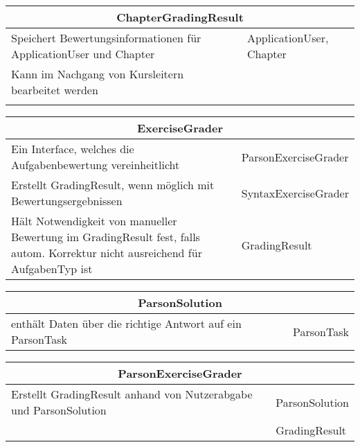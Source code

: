 \documentclass[11pt]{article}
\begin{document}
\begin{table}[h]
\begin{tabularx}{\textwidth}{|X|X|}
\hline
\multicolumn{2}{|c|}{ChapterGradingResult}\\ \hline
Speichert Bewertungsinformationen für ApplicationUser und Chapter& ApplicationUser, Chapter \\  \hline
Kann im Nachgang von Kursleitern bearbeitet werden& \\ \hline
& \\
\end{tabularx}
\end{table}

%
\begin{table}[h]
\begin{tabularx}{\textwidth}{|X|X|}
\hline
\multicolumn{2}{|c|}{ExerciseGrader}\\ \hline
Ein Interface, welches die Aufgabenbewertung vereinheitlicht & ParsonExerciseGrader  \\  \hline
Erstellt GradingResult, wenn möglich mit Bewertungsergebnissen &SyntaxExerciseGrader \\ \hline
Hält Notwendigkeit von manueller Bewertung im GradingResult fest, falls autom. Korrektur nicht ausreichend für AufgabenTyp ist & GradingResult\\ \hline
\end{tabularx}
\end{table}

\begin{table}[h]
\begin{tabularx}{\textwidth}{|X|X|}
\hline
\multicolumn{2}{|c|}{ParsonSolution}\\ \hline
enthält Daten über die richtige Antwort auf ein ParsonTask & ParsonTask \\ \hline
\end{tabularx}
\end{table}

\begin{table}[h]
\begin{tabularx}{\textwidth}{|X|X|}
\hline
\multicolumn{2}{|c|}{ParsonExerciseGrader}\\ \hline
Erstellt GradingResult anhand von Nutzerabgabe und ParsonSolution &ParsonSolution   \\ \hline
&GradingResult \\ \hline
\end{tabularx}
\end{table}
\end{document}

